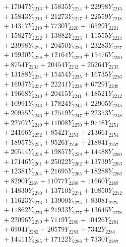 \documentclass[a4paper,10pt]{article}
\begin{document}
{\begin{align}
&\;  + 17047 Y_{2213} + 15835 Y_{2214} + 22998 Y_{2215} \\[0.3ex]
&\;  + 15843 Y_{2216} + 21273 Y_{2217} + 22559 Y_{2218} \\[0.5ex]\allowbreak
&\;  + 14317 Y_{2219} + 7730 Y_{2220} + 16529 Y_{2221} \\[0.3ex]
&\;  + 15827 Y_{2222} + 13882 Y_{2223} + 11555 Y_{2224} \\[0.3ex]
&\;  + 23998 Y_{2225} + 20450 Y_{2226} + 23283 Y_{2227} \\[0.3ex]
&\;  + 19930 Y_{2228} + 12164 Y_{2229} + 15476 Y_{2230} \\[0.3ex]
&\;  + 8754 Y_{2231} + 20454 Y_{2232} + 25264 Y_{2233} \\[0.3ex]
&\;  + 13188 Y_{2234} + 15454 Y_{2235} + 16735 Y_{2236} \\[0.3ex]
&\;  + 16937 Y_{2237} + 22241 Y_{2238} + 6729 Y_{2239} \\[0.3ex]
&\;  + 19668 Y_{2240} + 20415 Y_{2241} + 18521 Y_{2242} \\[0.3ex]
&\;  + 10991 Y_{2243} + 17824 Y_{2244} + 22905 Y_{2245} \\[0.3ex]
&\;  + 20955 Y_{2246} + 12519 Y_{2247} + 22353 Y_{2248} \\[0.5ex]\allowbreak
&\;  + 22707 Y_{2249} + 11008 Y_{2250} + 9748 Y_{2251} \\[0.3ex]
&\;  + 24166 Y_{2252} + 8542 Y_{2253} + 21366 Y_{2254} \\[0.3ex]
&\;  + 18957 Y_{2255} + 9526 Y_{2256} + 21884 Y_{2257} \\[0.3ex]
&\;  + 20514 Y_{2258} + 19857 Y_{2259} + 14488 Y_{2260} \\[0.3ex]
&\;  + 17146 Y_{2261} + 25022 Y_{2262} + 13739 Y_{2263} \\[0.3ex]
&\;  + 12381 Y_{2264} + 21695 Y_{2265} + 18288 Y_{2266} \\[0.3ex]
&\;  + 8290 Y_{2267} + 11077 Y_{2268} + 11660 Y_{2269} \\[0.3ex]
&\;  + 14830 Y_{2270} + 13710 Y_{2271} + 10850 Y_{2272} \\[0.3ex]
&\;  + 11623 Y_{2273} + 13900 Y_{2274} + 8308 Y_{2275} \\[0.3ex]
&\;  + 11862 Y_{2276} + 21933 Y_{2277} + 13645 Y_{2278} \\[0.5ex]\allowbreak
&\;  + 22096 Y_{2279} + 7119 Y_{2280} + 10426 Y_{2281} \\[0.3ex]
&\;  + 6904 Y_{2282} + 20579 Y_{2283} + 7342 Y_{2284} \\[0.3ex]
&\;  + 14411 Y_{2285} + 17122 Y_{2286} + 7330 Y_{2287} \\[0.3ex]

\end{align}}
\end{document}
